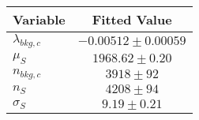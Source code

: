 \begin{tabular}[t]{lc}
\hline
Variable &Fitted Value\\
\hline\hline
$\lambda_{bkg,c}$&$-0.00512\pm0.00059$\\
\hline
$\mu_{S}$&$1968.62\pm0.20$\\
\hline
$n_{bkg,c}$&$3918\pm92$\\
\hline
$n_{S}$&$4208\pm94$\\
\hline
$\sigma_{S}$&$9.19\pm0.21$\\
\hline
\end{tabular}